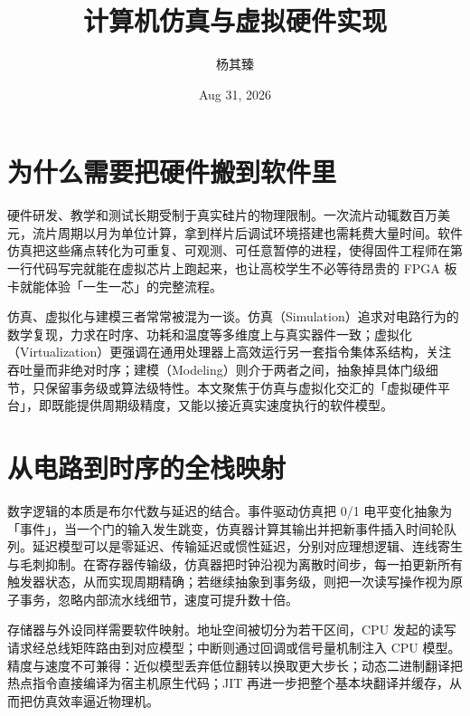 \title{计算机仿真与虚拟硬件实现}
\author{杨其臻}
\date{Aug 31, 2026}
\maketitle
\chapter{为什么需要把硬件搬到软件里}
硬件研发、教学和测试长期受制于真实硅片的物理限制。一次流片动辄数百万美元，流片周期以月为单位计算，拿到样片后调试环境搭建也需耗费大量时间。软件仿真把这些痛点转化为可重复、可观测、可任意暂停的进程，使得固件工程师在第一行代码写完就能在虚拟芯片上跑起来，也让高校学生不必等待昂贵的 FPGA 板卡就能体验「一生一芯」的完整流程。\par
仿真、虚拟化与建模三者常常被混为一谈。仿真（Simulation）追求对电路行为的数学复现，力求在时序、功耗和温度等多维度上与真实器件一致；虚拟化（Virtualization）更强调在通用处理器上高效运行另一套指令集体系结构，关注吞吐量而非绝对时序；建模（Modeling）则介于两者之间，抽象掉具体门级细节，只保留事务级或算法级特性。本文聚焦于仿真与虚拟化交汇的「虚拟硬件平台」，即既能提供周期级精度，又能以接近真实速度执行的软件模型。\par
\chapter{从电路到时序的全栈映射}
数字逻辑的本质是布尔代数与延迟的结合。事件驱动仿真把 0/1 电平变化抽象为「事件」，当一个门的输入发生跳变，仿真器计算其输出并把新事件插入时间轮队列。延迟模型可以是零延迟、传输延迟或惯性延迟，分别对应理想逻辑、连线寄生与毛刺抑制。在寄存器传输级，仿真器把时钟沿视为离散时间步，每一拍更新所有触发器状态，从而实现周期精确；若继续抽象到事务级，则把一次读写操作视为原子事务，忽略内部流水线细节，速度可提升数十倍。\par
存储器与外设同样需要软件映射。地址空间被切分为若干区间，CPU 发起的读写请求经总线矩阵路由到对应模型；中断则通过回调或信号量机制注入 CPU 模型。精度与速度不可兼得：近似模型丢弃低位翻转以换取更大步长；动态二进制翻译把热点指令直接编译为宿主机原生代码；JIT 再进一步把整个基本块翻译并缓存，从而把仿真效率逼近物理机。\par
